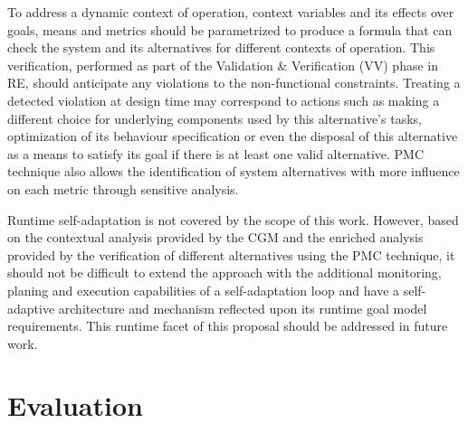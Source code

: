 To address a dynamic context of operation, context variables and its effects over goals, means and metrics should be parametrized to produce a formula that can check the system and its alternatives for different contexts of operation. This verification, performed as part of the Validation \& Verification (VV) phase in RE, should anticipate any violations to the non-functional constraints. Treating a detected violation at design time may correspond to actions such as making a different choice for underlying components used by this alternative's tasks, optimization of its behaviour specification or even the disposal of this alternative as a means to satisfy its goal if there is at least one valid alternative. PMC technique also allows the identification of system alternatives with more influence on each metric through sensitive analysis. 

Runtime self-adaptation is not covered by the scope of this work. However, based on the contextual analysis provided by the CGM and the enriched analysis provided by the verification of different alternatives using the PMC technique, it should not be difficult to extend the approach with the additional monitoring, planing and execution capabilities of a self-adaptation loop and have a self-adaptive architecture and mechanism reflected upon its runtime goal model requirements. This runtime facet of this proposal should be addressed in future work.




\section{Evaluation}

